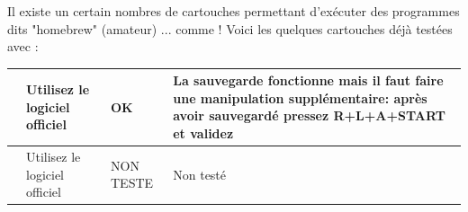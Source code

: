 \documentclass[12pt,a4paper]{article}
\begin{document}
    Il existe un certain nombres de cartouches permettant d'exécuter des programmes dits "homebrew" (amateur) ... comme \FAT ! Voici les quelques cartouches déjà testées avec \FAT :

    \tablelasttail{\hline}
    \begin{supertabular}{|p{3.5cm}|l|l|l|}
        \hline
            \begin{minipage}[c]{3cm}
            \vspace{0.5cm}
            \end{minipage} & 
            \begin{minipage}{3cm}
            Utilisez le logiciel officiel
            \end{minipage} &
            \begin{minipage}{2cm}
            \textcolor{vert}{OK}
            \end{minipage} &
            \begin{minipage}{7cm}
            La sauvegarde fonctionne mais il faut faire une manipulation supplémentaire: après avoir sauvegardé {\bf pressez R+L+A+START et validez}
            \end{minipage} \\
        \hline
            \begin{minipage}[c]{3cm}
            \vspace{0.5cm}
            \end{minipage} & 
            \begin{minipage}{3cm}
            Utilisez le logiciel officiel 
            \end{minipage} &
            \begin{minipage}{2cm}
            \textcolor{bleu}{NON TESTE}
            \end{minipage} &
            \begin{minipage}{7cm}
            Non testé
            \end{minipage} \\    

\end{supertabular}
\end{document}
